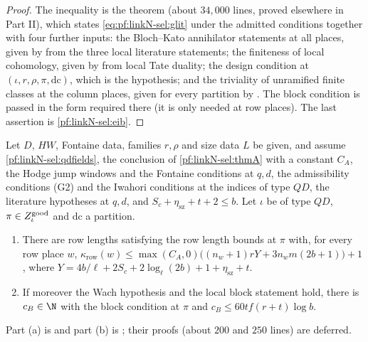 \begin{proof}
The inequality is the theorem  (about $34{,}000$ lines, proved elsewhere in Part II),
which states \eqref{eq:pf:linkN-sel:glit} under the admitted conditions together with four further inputs: the Bloch--Kato annihilator
statements at all places, given by  from the three
local literature statements; the finiteness of local cohomology, given by  from local Tate duality; the design condition at
$(\iota,r,\rho,\pi,\mathrm{dc})$, which is the hypothesis; and the triviality of unramified finite classes at the column places, given for
every partition by . The block condition is passed in the form required
there (it is only needed at row places). The last assertion is \cref{pf:linkN-sel:eib}.
\end{proof}

\begin{lemma}\label{pf:linkN-sel:rowblock}
Let $D$, $HW$, Fontaine data, families $r,\rho$ and size data $L$ be given, and assume \cref{pf:linkN-sel:qdfields}, the conclusion of
\cref{pf:linkN-sel:thmA} with a constant $C_A$, the Hodge jump windows and the Fontaine conditions at $q,d$, the admissibility conditions
(G2) and the Iwahori conditions at the indices of type $QD$, the literature hypotheses at $q,d$, and $S_c+\eta_{\mathrm{sz}}+t+2\le b$. Let
$\iota$ be of type $QD$, $\pi\in Z^{\mathrm{good}}_\iota$ and $\mathrm{dc}$ a partition.
\begin{enumerate}[label=(\alph*)]
\item There are row lengths satisfying the row length bounds at $\pi$ with, for every row place $w$,
$\kappa_{\mathrm{row}}(w)\le\max(C_A,0)\bigl((n_w+1)rY+3n_wm(2b+1)\bigr)+1$, where $Y=4b/\ell+2S_c+2\log_\ell(2b)+1+\eta_{\mathrm{sz}}+t$.
\item If moreover the Wach hypothesis and the local block statement hold, there is $c_B\in\N$ with the block condition at $\pi$ and
$c_B\le60tf(r+t)\log b$.
\end{enumerate}
\end{lemma}

Part (a) is  and part (b) is
; their proofs (about $200$ and $250$ lines) are deferred.

